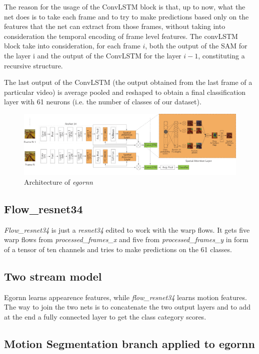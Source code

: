 \documentclass[10pt,twocolumn,hidelinks,letterpaper]{article}
\begin{document}
The reason for the usage of the ConvLSTM block is that, up to now, what the net does is to take each frame and to try to make predictions based only on the features that the net can extract from those frames, without taking into consideration the temporal encoding of frame level features. The convLSTM block take into consideration, for each frame $i$, both the output of the SAM for the layer i and the output of the ConvLSTM for the layer $i-1$, constituting a recursive structure.

The last output of the ConvLSTM (the output obtained from the last frame of a particular video) is average pooled and reshaped to obtain a final classification layer with 61 neurons (i.e. the number of classes of our dataset).

\begin{figure}
	\centering
	\includegraphics[width=\linewidth]{images/egornn.png}
	\caption{Architecture of \textit{egornn}}
	\label{egornn_arch}
\end{figure}

\subsection{Flow\_resnet34}

\textit{Flow\_resnet34} is just a \textit{resnet34} edited to work with the warp flows. It gets five warp flows from \textit{processed\_frames\_x} and five from \textit{processed\_frames\_y} in form of a tensor of ten channels and tries to make predictions on the 61 classes.

\subsection{Two stream model}

Egornn learns appearence features, while \textit{flow\_resnet34} learns motion features. The way to join the two nets is to concatenate the two output layers and to add at the end a fully connected layer to get the class category scores.

\subsection{Motion Segmentation branch applied to egornn}
\end{document}
